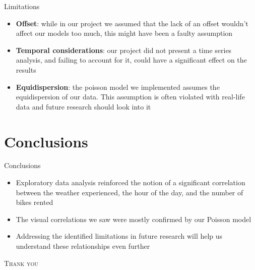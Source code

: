 \documentclass{minesbeamer}
\begin{document}
\begin{frame}{Limitations}
    \begin{itemize}
        \item \textbf{Offset}: while in our project we assumed that the lack of an offset
wouldn’t affect our models too much, this might have been a faulty assumption
        \item \textbf{Temporal considerations}: our project did not present a time series analysis, and failing to account for it, could have a significant effect on the results
        \item \textbf{Equidispersion}: the poisson model we implemented assumes the equidispersion of our data. This assumption is often violated with real-life data and future research should look into it
    \end{itemize}
\end{frame}

\section{Conclusions}

\begin{frame}{Conclusions}
    \begin{itemize}
        \item Exploratory data analysis
reinforced the notion of a significant correlation between the weather experienced, the hour of the day, and the number of bikes rented
        \item The visual correlations we saw were mostly confirmed by our Poisson model
        \item Addressing the identified
limitations in future research will help us understand these relationships even further
    \end{itemize}
\end{frame}

\begin{frame}[standout]
    \Huge\textsc{Thank you}
\end{frame}

\appendix
\end{document}
